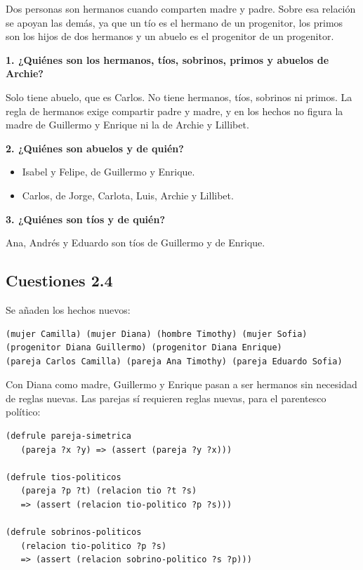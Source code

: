 Dos personas son hermanos cuando comparten madre y padre. Sobre esa relación se apoyan las demás, ya que un tío es el hermano de un progenitor, los primos son los hijos de dos hermanos y un abuelo es el progenitor de un progenitor.

\textbf{1. ¿Quiénes son los hermanos, tíos, sobrinos, primos y abuelos de Archie?}

Solo tiene abuelo, que es Carlos. No tiene hermanos, tíos, sobrinos ni primos. La regla de hermanos exige compartir padre y madre, y en los hechos no figura la madre de Guillermo y Enrique ni la de Archie y Lillibet.

\textbf{2. ¿Quiénes son abuelos y de quién?}

\begin{itemize}
\item Isabel y Felipe, de Guillermo y Enrique.
\item Carlos, de Jorge, Carlota, Luis, Archie y Lillibet.
\end{itemize}

\textbf{3. ¿Quiénes son tíos y de quién?}

Ana, Andrés y Eduardo son tíos de Guillermo y de Enrique.

\subsection{Cuestiones 2.4}

Se añaden los hechos nuevos:

\begin{lstlisting}
(mujer Camilla) (mujer Diana) (hombre Timothy) (mujer Sofia)
(progenitor Diana Guillermo) (progenitor Diana Enrique)
(pareja Carlos Camilla) (pareja Ana Timothy) (pareja Eduardo Sofia)
\end{lstlisting}

Con Diana como madre, Guillermo y Enrique pasan a ser hermanos sin necesidad de reglas nuevas. Las parejas sí requieren reglas nuevas, para el parentesco político:

\begin{lstlisting}
(defrule pareja-simetrica
   (pareja ?x ?y) => (assert (pareja ?y ?x)))

(defrule tios-politicos
   (pareja ?p ?t) (relacion tio ?t ?s)
   => (assert (relacion tio-politico ?p ?s)))

(defrule sobrinos-politicos
   (relacion tio-politico ?p ?s)
   => (assert (relacion sobrino-politico ?s ?p)))
\end{lstlisting}

